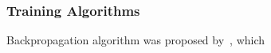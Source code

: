 \subsubsection{Training Algorithms}
Backpropagation algorithm was proposed by~\citet{werbos1975beyond}, which 